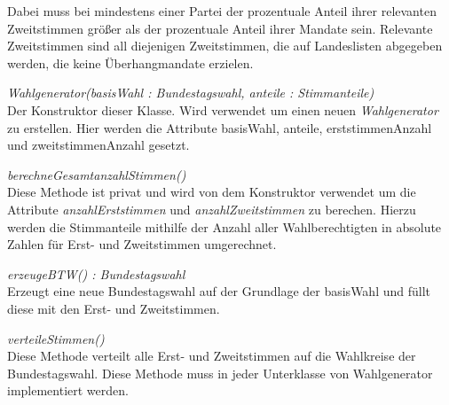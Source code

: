 \documentclass[12pt,a4paper,titlepage]{article}
\newcommand{\mymo}{\fontfamily{pcr}\selectfont \textit}
\begin{document}
Dabei muss bei mindestens einer Partei der prozentuale Anteil ihrer relevanten Zweitstimmen größer als der prozentuale Anteil ihrer Mandate sein. Relevante Zweitstimmen sind all diejenigen Zweitstimmen, die auf Landeslisten abgegeben werden, die keine Überhangmandate erzielen.


\begin{description}
\item {\mymo{Wahlgenerator(basisWahl : Bundestagswahl, anteile : Stimmanteile)}} \\
Der Konstruktor dieser Klasse. Wird verwendet um einen neuen {\mymo{Wahlgenerator}} zu erstellen. Hier werden die Attribute basisWahl, anteile, erststimmenAnzahl und zweitstimmenAnzahl gesetzt.
\item {\mymo{berechneGesamtanzahlStimmen()}} \\
Diese Methode ist privat und wird von dem Konstruktor verwendet um die Attribute {\mymo{anzahlErststimmen}} und {\mymo{anzahlZweitstimmen}} zu berechen. Hierzu werden die Stimmanteile mithilfe der Anzahl aller Wahlberechtigten in absolute Zahlen für Erst- und Zweitstimmen umgerechnet.
\item {\mymo{erzeugeBTW() : Bundestagswahl}} \\
Erzeugt eine neue Bundestagswahl auf der Grundlage der basisWahl und füllt diese mit den Erst- und Zweitstimmen.
\item {\mymo{verteileStimmen()}} \\
Diese Methode verteilt alle Erst- und Zweitstimmen auf die Wahlkreise der Bundestagswahl. Diese Methode muss in jeder Unterklasse von Wahlgenerator implementiert werden.
\end{description}
\newpage
\end{document}
